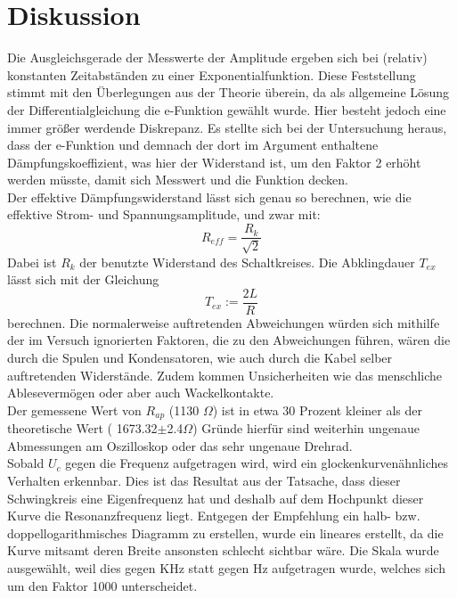 \section{Diskussion}

Die Ausgleichsgerade der Messwerte der Amplitude ergeben sich bei (relativ) konstanten Zeitabständen zu einer Exponentialfunktion. 
Diese Feststellung stimmt mit den Überlegungen aus der Theorie überein, da als allgemeine Lösung der Differentialgleichung die e-Funktion gewählt wurde. 
Hier besteht jedoch eine immer größer werdende Diskrepanz. 
Es stellte sich bei der Untersuchung heraus, dass der e-Funktion und demnach der dort im Argument enthaltene Dämpfungskoeffizient, was hier der Widerstand ist, um den Faktor 2 erhöht werden müsste, damit sich Messwert und die Funktion decken. 
\\
Der effektive Dämpfungswiderstand lässt sich genau so berechnen, wie die effektive Strom- und Spannungsamplitude, und zwar mit:
\begin{equation}
    R_{eff} = \frac{R_k}{\sqrt{2}} 
\end{equation}
Dabei ist \(R_k\) der benutzte Widerstand des Schaltkreises.
Die Abklingdauer \(T_{ex}\) lässt sich mit der Gleichung
\begin{equation}
    T_{ex} := \frac{2L}{R}
\end{equation}
berechnen.
Die normalerweise auftretenden Abweichungen würden sich mithilfe der im Versuch ignorierten Faktoren, die zu den Abweichungen führen, wären die durch die Spulen und Kondensatoren, wie auch durch die Kabel selber auftretenden Widerstände. 
Zudem kommen Unsicherheiten wie das menschliche Ablesevermögen oder aber auch Wackelkontakte.
\\
Der gemessene Wert von \(R_{ap}\) (1130 \(\Omega\)) ist in etwa 30 Prozent kleiner als der theoretische Wert ( 1673.32\(\pm\)2.4\(\Omega\)) %
Gründe hierfür sind weiterhin ungenaue Abmessungen am Oszilloskop oder das sehr ungenaue Drehrad.
\\
Sobald \(U_c\) gegen die Frequenz aufgetragen wird, wird ein glockenkurvenähnliches Verhalten erkennbar. 
Dies ist das Resultat aus der Tatsache, dass dieser Schwingkreis eine Eigenfrequenz hat und deshalb auf dem Hochpunkt dieser Kurve die Resonanzfrequenz liegt. 
Entgegen der Empfehlung ein halb- bzw. doppellogarithmisches Diagramm zu erstellen, wurde ein lineares erstellt, da die Kurve mitsamt deren Breite ansonsten schlecht sichtbar wäre. 
Die Skala wurde ausgewählt, weil dies gegen KHz statt gegen Hz aufgetragen wurde, welches sich um den Faktor 1000 unterscheidet. 
